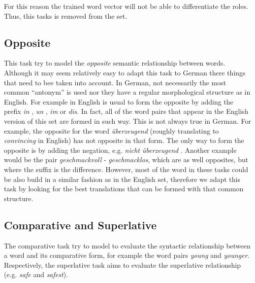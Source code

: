 For this reason the trained word vector will not be able to differentiate the
roles. Thus, this tasks is removed from the set. 

\subsection{Opposite}
\label{sec:sub_sec_opposite}
This task try to model the \emph{opposite} semantic relationship between words.
Although it may seem relatively easy to adapt this task to German there
things that need to bee taken into account. In German,  not necessarily the
most common ``antonym'' is used nor they have a regular morphological
structure as in English. For example  in English is usual to form the
opposite by adding the prefix \textit{in} ,  \textit{un} , \textit{im} or
\textit{dis}. In fact, all of the word pairs that appear in the English
version of this set are formed in such way. This is not always true in
German. For example, the opposite for the word  \textit{\"{u}berzeugend} (roughly
translating to \emph{convincing} in English) has not opposite in that form.
The only way to form the opposite is by adding the negation, e.g.
\textit{nicht  \"{u}berzeugend }. Another example would be the pair
\textit{geschmackvoll} - \textit{geschmacklos}, which are as well opposites,
but where the suffix is the difference.
However, most of the word in these tasks could be also build in a similar
fashion as in the English set, therefore we adapt this task by looking for
the best translations that can be formed with that common structure.

\subsection{Comparative and Superlative}
\label{sec:sub_sec_comparative_sup}

The comparative task  try to model to evaluate the syntactic relationship between a word
and its comparative form, for example the word pairs  \textit{young} and
\textit{younger}. Respectively, the superlative task aims to evaluate the
superlative relationship  (e.g. \textit{safe}  and \textit{safest}). 

